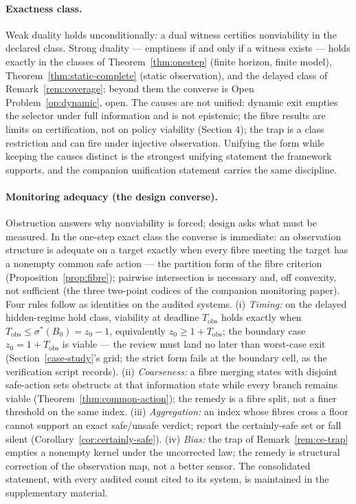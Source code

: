\documentclass[10pt,twocolumn]{article}
\theoremstyle{definition}
\begin{document}
\paragraph{Exactness class.} Weak duality holds unconditionally: a dual witness certifies nonviability in the declared class. Strong duality --- emptiness if and only if a witness exists --- holds exactly in the classes of Theorem~\ref{thm:onestep} (finite horizon, finite model), Theorem~\ref{thm:static-complete} (static observation), and the delayed class of Remark~\ref{rem:coverage}; beyond them the converse is Open Problem~\ref{op:dynamic}, open. The causes are not unified: dynamic exit empties the selector under full information and is not epistemic; the fibre results are limits on certification, not on policy viability (Section 4); the trap is a class restriction and can fire under injective observation. Unifying the form while keeping the causes distinct is the strongest unifying statement the framework supports, and the companion unification statement carries the same discipline.

\paragraph{Monitoring adequacy (the design converse).} Obstruction answers why nonviability is forced; design asks what must be measured. In the one-step exact class the converse is immediate: an observation structure is adequate on a target exactly when every fibre meeting the target has a nonempty common safe action --- the partition form of the fibre criterion (Proposition~\ref{prop:fibre}); pairwise intersection is necessary and, off convexity, not sufficient (the three two-point codices of the companion monitoring paper). Four rules follow as identities on the audited systems. (i) \emph{Timing:} on the delayed hidden-regime hold class, viability at deadline \(T_{\mathrm{obs}}\) holds exactly when \(T_{\mathrm{obs}} \le \sigma^{*}(B_{0}) = z_{0} - 1\), equivalently \(z_{0} \ge 1 + T_{\mathrm{obs}}\); the boundary case \(z_{0} = 1 + T_{\mathrm{obs}}\) is viable --- the review must land no later than worst-case exit (Section~\ref{case-study}'s grid; the strict form fails at the boundary cell, as the verification script records). (ii) \emph{Coarseness:} a fibre merging states with disjoint safe-action sets obstructs at that information state while every branch remains viable (Theorem~\ref{thm:common-action}); the remedy is a fibre split, not a finer threshold on the same index. (iii) \emph{Aggregation:} an index whose fibres cross a floor cannot support an exact safe/unsafe verdict; report the certainly-safe set or fall silent (Corollary~\ref{cor:certainly-safe}). (iv) \emph{Bias:} the trap of Remark~\ref{rem:ce-trap} empties a nonempty kernel under the uncorrected law; the remedy is structural correction of the observation map, not a better sensor. The consolidated statement, with every audited count cited to its system, is maintained in the supplementary material.
\end{document}
